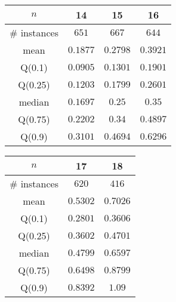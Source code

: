 \begin{tabular}{c|ccc} 
\hline 
$n$ & 14 & 15 & 16 \tabularnewline 
\hline 
\hline 
\# instances & $651$ & $667$ & $644$ \tabularnewline 
mean & $0.1877$ & $0.2798$ & $0.3921$ \tabularnewline 
Q(0.1) & $0.0905$ & $0.1301$ & $0.1901$ \tabularnewline 
Q(0.25) & $0.1203$ & $0.1799$ & $0.2601$ \tabularnewline 
median & $0.1697$ & $0.25$ & $0.35$ \tabularnewline 
Q(0.75) & $0.2202$ & $0.34$ & $0.4897$ \tabularnewline 
Q(0.9) & $0.3101$ & $0.4694$ & $0.6296$ \tabularnewline 
\hline 
\end{tabular} 
\medskip{} 

\begin{tabular}{c|cc} 
\hline 
$n$ & 17 & 18 \tabularnewline 
\hline 
\hline 
\# instances & $620$ & $416$ \tabularnewline 
mean & $0.5302$ & $0.7026$ \tabularnewline 
Q(0.1) & $0.2801$ & $0.3606$ \tabularnewline 
Q(0.25) & $0.3602$ & $0.4701$ \tabularnewline 
median & $0.4799$ & $0.6597$ \tabularnewline 
Q(0.75) & $0.6498$ & $0.8799$ \tabularnewline 
Q(0.9) & $0.8392$ & $1.09$ \tabularnewline 
\hline 
\end{tabular} 
\medskip{} 

